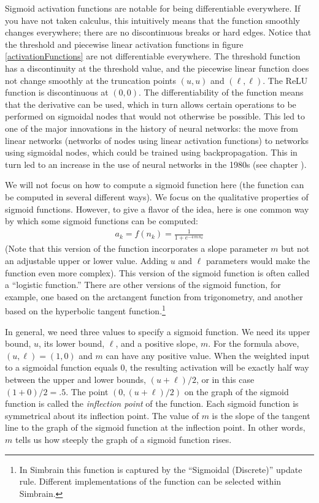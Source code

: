 Sigmoid activation functions are notable for being differentiable everywhere. If you have not taken calculus, this intuitively means that the function smoothly changes everywhere; there are no discontinuous breaks or hard edges. Notice that the threshold and piecewise linear activation functions in figure \ref{activationFunctions} are not differentiable everywhere. The threshold function has a discontinuity at the threshold value, and the piecewise linear function does not change smoothly at the truncation points $(u,u)$ and $(\ell,\ell)$. The ReLU function is discontinuous at $(0,0)$. The differentiability of the function means that the derivative can be used, which in turn allows certain operations to be performed on sigmoidal nodes that would not otherwise be possible. This led to one of the major innovations in the history of neural networks: the move from linear networks (networks of nodes using linear activation functions) to networks using sigmoidal nodes, which could be trained using backpropagation. This in turn led to an increase in the use of neural networks in the 1980s (see chapter ). 

   We will not focus on how to compute a sigmoid function here (the function can be computed in several different ways). We focus on 
the qualitative properties of sigmoid functions. However, to give a flavor of 
the idea, here is one common way by which some sigmoid functions can be 
computed: 
\begin{eqnarray*}
a_k = f(n_k) = \frac{1}{1+e^{-4\, m\, n_k}}
\end{eqnarray*}
(Note that this version of the function incorporates a slope parameter $m$ but not an adjustable upper or lower value. Adding $u$ and $\ell$ parameters would make the function even more complex). This version of the sigmoid function is often called a ``logistic function.''  There are other versions of the sigmoid function, for example, one based on the arctangent function from trigonometry, and another based on the hyperbolic tangent function.\footnote{In Simbrain this function is captured by the ``Sigmoidal (Discrete)'' update rule. Different implementations of the function can be selected within Simbrain.} 

In general, we need three values to specify a sigmoid function. We 
need its upper bound, $u$, its lower bound, $\ell$, and a positive slope, $m$. 
For the formula above, $(u,\ell) = (1,0)$ and $m$ can have any positive value.
When the weighted input to a sigmoidal function equals $0$, the resulting activation will be exactly half way 
between the upper and lower bounds, \ie $(u + \ell)/2$, or in this case $(1+0)/2 = .5$. 
The point $(0,  (u + \ell)/2)$ on the graph of the sigmoid function is called the {\em 
inflection point} of the function. Each sigmoid function is symmetrical about
its inflection point. The value of $m$ is the slope of the tangent line to the 
graph of the sigmoid function at the inflection point. In other words, $m$ 
tells us how steeply the graph of a sigmoid function rises.

